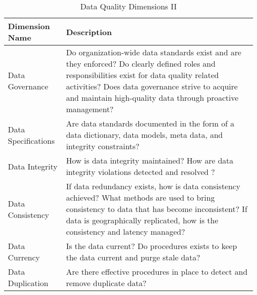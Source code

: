 \begin{table}
\caption{Data Quality Dimensions II}
\centering
\begin{tabular}{p{4.0cm} p{11cm}}
\toprule
Dimension Name & Description \\ 
\bottomrule
Data Governance & 
Do organization-wide data standards exist and are they enforced? Do clearly
defined roles and responsibilities exist for data quality related activities? Does
data governance strive to acquire and maintain high-quality data through proactive
management? \\

Data Specifications &
Are data standards documented in the form of a data dictionary, 
data models, meta data, and integrity constraints?  
\\

Data Integrity & 
How is data integrity maintained? How are data integrity violations detected and
resolved ?   
\\

Data Consistency & 
If data redundancy exists, how is data consistency achieved? What methods
are used to bring consistency to data that has become inconsistent? If data is
geographically replicated, how is the consistency and latency managed? 
\\

Data Currency & 
Is the data current? Do procedures exists to keep the data current and purge stale
data? 
\\

Data Duplication & Are there effective procedures in place to detect and remove duplicate data? 
\\


\end{tabular}
\end{table}
